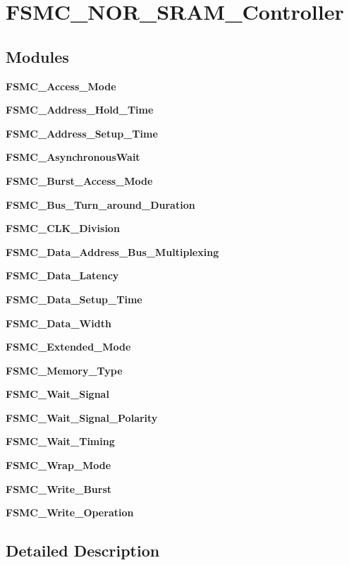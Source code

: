\section{F\+S\+M\+C\+\_\+\+N\+O\+R\+\_\+\+S\+R\+A\+M\+\_\+\+Controller}
\label{group__FSMC__NOR__SRAM__Controller}
\subsection*{Modules}
\begin{DoxyCompactItemize}
\item 
\textbf{ F\+S\+M\+C\+\_\+\+Access\+\_\+\+Mode}
\item 
\textbf{ F\+S\+M\+C\+\_\+\+Address\+\_\+\+Hold\+\_\+\+Time}
\item 
\textbf{ F\+S\+M\+C\+\_\+\+Address\+\_\+\+Setup\+\_\+\+Time}
\item 
\textbf{ F\+S\+M\+C\+\_\+\+Asynchronous\+Wait}
\item 
\textbf{ F\+S\+M\+C\+\_\+\+Burst\+\_\+\+Access\+\_\+\+Mode}
\item 
\textbf{ F\+S\+M\+C\+\_\+\+Bus\+\_\+\+Turn\+\_\+around\+\_\+\+Duration}
\item 
\textbf{ F\+S\+M\+C\+\_\+\+C\+L\+K\+\_\+\+Division}
\item 
\textbf{ F\+S\+M\+C\+\_\+\+Data\+\_\+\+Address\+\_\+\+Bus\+\_\+\+Multiplexing}
\item 
\textbf{ F\+S\+M\+C\+\_\+\+Data\+\_\+\+Latency}
\item 
\textbf{ F\+S\+M\+C\+\_\+\+Data\+\_\+\+Setup\+\_\+\+Time}
\item 
\textbf{ F\+S\+M\+C\+\_\+\+Data\+\_\+\+Width}
\item 
\textbf{ F\+S\+M\+C\+\_\+\+Extended\+\_\+\+Mode}
\item 
\textbf{ F\+S\+M\+C\+\_\+\+Memory\+\_\+\+Type}
\item 
\textbf{ F\+S\+M\+C\+\_\+\+Wait\+\_\+\+Signal}
\item 
\textbf{ F\+S\+M\+C\+\_\+\+Wait\+\_\+\+Signal\+\_\+\+Polarity}
\item 
\textbf{ F\+S\+M\+C\+\_\+\+Wait\+\_\+\+Timing}
\item 
\textbf{ F\+S\+M\+C\+\_\+\+Wrap\+\_\+\+Mode}
\item 
\textbf{ F\+S\+M\+C\+\_\+\+Write\+\_\+\+Burst}
\item 
\textbf{ F\+S\+M\+C\+\_\+\+Write\+\_\+\+Operation}
\end{DoxyCompactItemize}


\subsection{Detailed Description}
